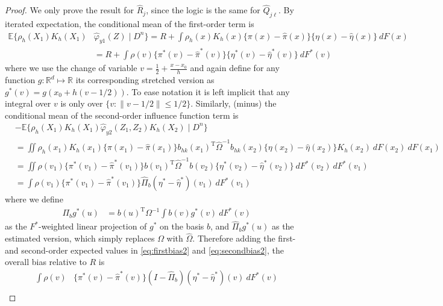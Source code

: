 \documentclass[11pt,twoside]{article}
\def\T{{ \mathrm{\scriptscriptstyle T} }}
\newcommand{\E}{\mathbb{E}}
\newcommand{\R}{\mathbb{R}}
\theoremstyle{definition}
\theoremstyle{remark}
\begin{document}
\begin{proof}
We only prove the result for $\widehat{R}_j$, since the logic is the same for $\widehat{Q}_{j\ell}$. By iterated expectation, the conditional mean of the first-order term is
\begin{align} 
\E\{ \rho_h(X_1)  K_h(X_1) & \widehat\varphi_{y1}(Z) \mid D^n \} = R + \int  \rho_h(x) K_h(x)  \{ \pi(x) - \widehat\pi(x) \}\{ \eta(x) - \widehat\eta(x) \}  \ dF(x) \nonumber \\
& = R + \int \rho(v) \{ \pi^*(v) - \widehat\pi^*(v) \}\{ \eta^*(v) - \widehat\eta^*(v) \}  \ dF^*(v) \label{eq:firstbias2}
\end{align}
where we use the change of variable $v = \frac{1}{2} + \frac{x-x_0}{h}$ and again define for any function $g: \R^d \mapsto \R$ its corresponding stretched version as $g^*(v) = g(x_0 + h(v-1/2))$. To ease notation it is left implicit that any integral over $v$ is only over $\{v : \|v-1/2\| \leq 1/2 \}$. 
Similarly, (minus) the conditional mean of the second-order influence function term is
\begin{align}
&-\E\{   \rho_h(X_1) K_h(X_1) \widehat\varphi_{y2}(Z_1,Z_2)K_h(X_2) \mid D^n \} \nonumber \\
&=  \iint  \rho_h(x_1) K_h(x_1) \{\pi(x_1) - \widehat\pi(x_1)\} b_{hk}(x_1)^\T \widehat\Omega^{-1} b_{hk}(x_2) \{ \eta(x_2) - \widehat\eta(x_2)\} K_h(x_2) \ dF(x_2) \ dF(x_1) \nonumber \\
&=  \iint \rho(v_1)  \{\pi^*(v_1) - \widehat\pi^*(v_1)\} b(v_1)^\T \widehat\Omega^{-1} b(v_2) \{ \eta^*(v_2) - \widehat\eta^*(v_2)\}  \ dF^*(v_2) \ dF^*(v_1) \nonumber \\
&=  \int \rho(v_1)\{\pi^*(v_1) - \widehat\pi^*(v_1)\} \widehat\Pi_{b}(\eta^*-\widehat\eta^*)(v_1) \ dF^*(v_1) \label{eq:secondbias2}
\end{align}
where we define
\begin{align*}
\Pi_{b}g^*(u) &= b(u)^\T \Omega^{-1} \int {b}(v) g^*(v) \ dF^*(v) 
\end{align*}
as the $F^*$-weighted linear projection of $g^*$ on the basis $b$, and $\widehat\Pi_{b} g^*(u)$ as the estimated version, which simply replaces $\Omega$ with $\widehat\Omega$. 
Therefore adding the first- and second-order expected values in \eqref{eq:firstbias2} and \eqref{eq:secondbias2}, the overall bias relative to $R$ is
\begin{align}
\int  \rho(v) & \{ \pi^*(v) - \widehat\pi^*(v)\} (I-\widehat\Pi_{b}) (\eta^* - \widehat\eta^*)(v) \ dF^*(v) \nonumber \\

\end{align}
\end{proof}
\end{document}
